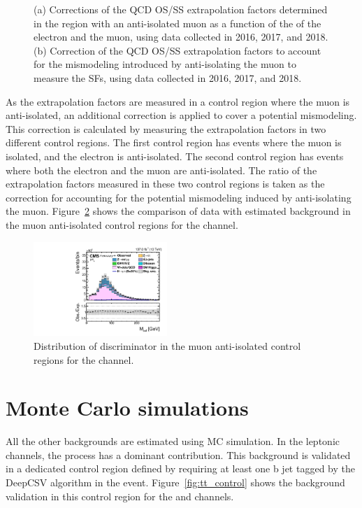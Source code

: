 \begin{figure}[htbp]
{  }
  \caption{(a) Corrections of the QCD OS/SS extrapolation factors determined in the region with an anti-isolated muon as a function of the \pt of the electron and the muon, using data collected in 2016, 2017, and 2018. (b) Correction of the QCD OS/SS extrapolation factors to account for the mismodeling introduced by anti-isolating the muon to measure the SFs, using data collected in 2016, 2017, and 2018.}
  \label{fig:osss_corr}
\end{figure}

As the extrapolation factors are measured in a control region where the muon is anti-isolated, an additional correction is applied to cover a potential mismodeling. This correction is calculated by measuring the extrapolation factors in two different control regions. The first control region has events where the muon is isolated, and the electron is anti-isolated. The second control region has events where both the electron and the muon are anti-isolated. The ratio of the extrapolation factors measured in these two control regions is taken as the correction for accounting for the potential mismodeling induced by anti-isolating the muon. Figure~\ref{fig:qcd_control} shows the comparison of data with estimated background in the muon anti-isolated control regions for the \mue channel.

\begin{figure}[htbp!]
  \centering
  \includegraphics[width=0.45\textwidth]{plots/chapter7/Fake/mue/QCD.pdf}
  \caption{Distribution of \mcol discriminator in the muon anti-isolated control regions for the \mue channel.}
  \label{fig:qcd_control}
\end{figure}

\section{Monte Carlo simulations}
All the other backgrounds are estimated using MC simulation. In the leptonic channels, the \ttbar process has a dominant contribution. This background is validated in a dedicated control region defined by requiring at least one b jet tagged by the DeepCSV algorithm in the event. Figure~\ref{fig:tt_control} shows the background validation in this control region for the \mue and \emu channels.

